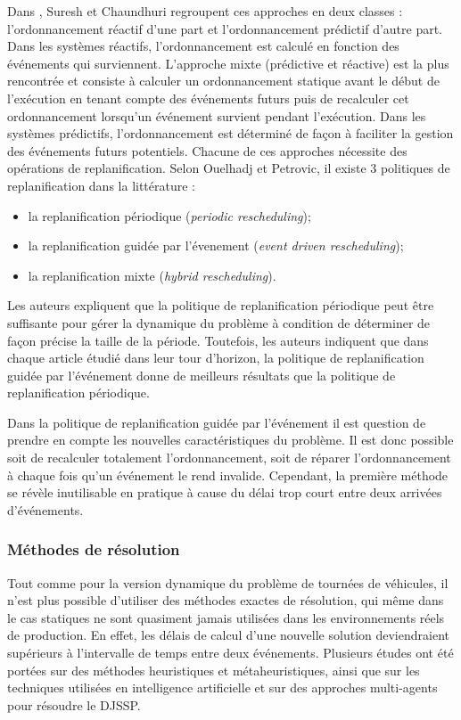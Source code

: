 Dans \cite{Suresh1993}, Suresh et Chaundhuri regroupent ces approches en deux classes : l'ordonnancement réactif d'une part et l'ordonnancement prédictif d'autre part. Dans les systèmes réactifs, l'ordonnancement est calculé en fonction des événements qui surviennent. L'approche mixte (prédictive et réactive) est la plus rencontrée et consiste à calculer un ordonnancement statique avant le début de l'exécution en tenant compte des événements futurs puis de recalculer cet ordonnancement lorsqu'un événement survient pendant l'exécution. Dans les systèmes prédictifs, l'ordonnancement est déterminé de façon à faciliter la gestion des événements futurs potentiels.
Chacune de ces approches nécessite des opérations de replanification. Selon Ouelhadj et Petrovic, il existe 3 politiques de replanification dans la littérature : 
\begin{itemize}
 \item la replanification périodique (\textit{periodic rescheduling});
 \item la replanification guidée par l'évenement (\textit{event driven rescheduling});
 \item la replanification mixte (\textit{hybrid rescheduling}).
\end{itemize}
Les auteurs expliquent que la politique de replanification périodique peut être suffisante pour gérer la dynamique du problème à condition de déterminer de façon précise la taille de la période. Toutefois, les auteurs indiquent que dans chaque article étudié dans leur tour d'horizon, la politique de replanification guidée par l'événement donne de meilleurs résultats que la politique de replanification périodique.

Dans la politique de replanification guidée par l'événement il est question de prendre en compte les nouvelles caractéristiques du problème. Il est donc possible soit de recalculer totalement l'ordonnancement, soit de réparer l'ordonnancement à chaque fois qu'un événement le rend invalide. Cependant, la première méthode se révèle inutilisable en pratique à cause du délai trop court entre deux arrivées d'événements.

\subsubsection{Méthodes de résolution}

Tout comme pour la version dynamique du problème de tournées de véhicules, il n'est plus possible d'utiliser des méthodes exactes de résolution, qui même dans le cas statiques ne sont quasiment jamais utilisées dans les environnements réels de production. En effet, les délais de calcul d'une nouvelle solution deviendraient supérieurs à l'intervalle de temps entre deux événements. Plusieurs études ont été portées sur des méthodes heuristiques et métaheuristiques, ainsi que sur les techniques utilisées en intelligence artificielle et sur des approches multi-agents pour résoudre le DJSSP.

